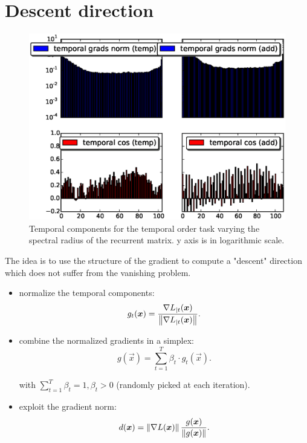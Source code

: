 \section{Descent direction}

\begin{figure}
	\includegraphics[width=1.4\textwidth]{chapter3/compare_add_temp_norms_1.eps}
	\caption{Temporal components for the temporal order task varying the spectral radius of the recurrent matrix. y axis is in logarithmic scale.}
	\label{fig:}
\end{figure}


The idea is to use the structure of the gradient to compute a "descent" direction which does not suffer from the vanishing problem.

\begin{itemize}
	\item normalize the temporal components:
	\begin{equation}
	g_t(\boldsymbol{x}) = \frac{\nabla L_{|t}(\boldsymbol{x})}{\left\Vert \nabla L_{|t}(\boldsymbol{x}) \right\Vert}.
	\end{equation}
	
	\item combine the normalized gradients in a simplex:
	\begin{equation}
	g(\vec{x}) = \sum_{t=1}^T \beta_t \cdot g_t(\vec{x}).
	\end{equation}
	
	with $\sum_{t=1}^T\beta_t=1, \beta_t>0$ (randomly picked at each iteration).
	\item exploit the gradient norm:
	\begin{equation}
	d(\boldsymbol{x}) = \left\Vert \nabla L (\boldsymbol{x}) \right\Vert\frac{g(\boldsymbol{x})}{\left\Vert g(\boldsymbol{x}) \right\Vert}.
	\end{equation}
\end{itemize}
